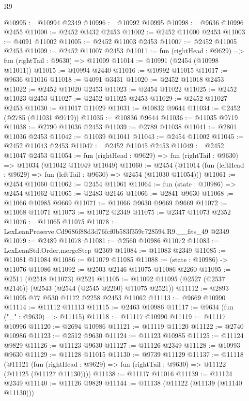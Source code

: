 \begin{lexlean}{R9}
\begin{coremodule}
@10995 := @10994 @2349
@10996 := @10992 @10995
@10998 := @9636 @10996 @2455
@11000 := @2452 @3432 @2453
@11002 := @2452 @11000 @2453
@11003 := @4091 @11002
@11005 := @2452 @11003 @2453
@11007 := @2452 @11005 @2453
@11009 := @2452 @11007 @2453
@11011 := fun (rightHead : @9629) => fun (rightTail : @9630) => @11009
@11014 := @10991 (@2454 (@10998 @11011))
@11015 := @10994 @2440
@11016 := @10992 @11015
@11017 := @9636 @11016
@11018 := @4091 @3431
@11020 := @2452 @11018 @2453
@11022 := @2452 @11020 @2453
@11023 := @2454 @11022
@11025 := @2452 @11023 @2453
@11027 := @2452 @11025 @2453
@11029 := @2452 @11027 @2453
@11030 := @11017 @11029
@11031 := @10832 @9644
@11034 := @2452 (@2785 (@11031 @9719))
@11035 := @10836 @9644
@11036 := @11035 @9719
@11038 := @2790 @11036 @2453
@11039 := @2789 @11038
@11041 := @2801 @11036 @2453
@11042 := @11039 @11041
@11043 := @2454 @11002
@11045 := @2452 @11043 @2453
@11047 := @2452 @11045 @2453
@11049 := @2452 @11047 @2453
@11054 := fun (rightHead : @9629) => fun (rightTail : @9630) => @11034 (@11042 @11049 @11049)
@11060 := @2454 (@11014 (fun (leftHead : @9629) => fun (leftTail : @9630) => @2454 (@11030 @11054)))
@11061 := @2454 @11060
@11062 := @2454 @11061
@11064 := fun (state : @10986) => @2454 @11062
@11065 := @2483 @2146
@11066 := @2841 @9630
@11068 := @11066 @10985 @9669
@11071 := @11066 @9630 @9669 @9669
@11072 := @11068 @11071
@11073 := @11072 @2349
@11075 := @2347 @11073 @2352
@11076 := @11065 @11075
@11078 := LexLeanPreserve.Cd9686f88d3d76fcf0b583f359c728594.R9.__fits_49 @2349
@11079 := @2489 @11078
@11081 := @2560 @10986 @11072
@11083 := LexLeanStd.Order.mergeStep @2369
@11084 := @11083 @2349
@11085 := @11081 @11084
@11086 := @11079 @11085
@11088 := (state : @10986) -> @11076 @11086
@11092 := @2503 @2146 @11075 @11086 @2260
@11095 := @2511 (@2518 @11073) @2521
@11105 := @11092 @11095 (@2527 (@2537 @2146)) (@2543 (@2544 (@2545 @2260) @11075 @2521))
@11112 := @2893 @11095 @77 @530 @1172 @2258 @2453 @11062
@11113 := @9669 @10990
@11114 := @11112 @11113
@11115 := @2463 @10986
@11117 := @9634 (fun ("_" : @9630) => @11115)
@11118 := @11117 @10990
@11119 := @11117 @10996
@11120 := @2694 @10986
@11121 := @11119 @11120
@11122 := @2740 @10986
@11123 := @2512 @9630
@11124 := @11123 @10985
@11125 := @11124 @9829
@11126 := @11123 @9630
@11127 := @11126 @2349
@11128 := @10993 @9630
@11129 := @11128 @11015
@11130 := @9739 @11129
@11137 := @11118
    (@11121 (fun (rightHead : @9629) => fun (rightTail : @9630) => @11122 (@11125 (@11127 @11130))))
@11138 := @11117 @11016
@11139 := @11124 @2349
@11140 := @11126 @9829
@11144 := @11138 (@11122 (@11139 (@11140 @11130)))

\end{coremodule}
\end{lexlean}
